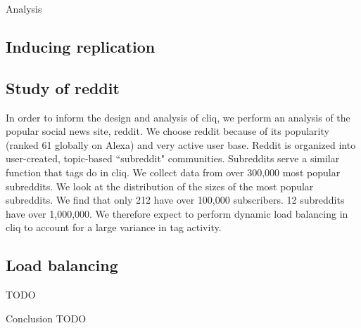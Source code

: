 \documentclass{sig-alternate}
\begin{document}
\begin{section}{Analysis}

\subsection{Inducing replication}
\label{subsec:inducereplication}


\subsection{Study of reddit}
\label{subsec:redditstudy}

In order to inform the design and analysis of cliq, we perform an analysis of the popular social news site, reddit. We choose reddit because of its popularity (ranked 61 globally on Alexa) and very active user base. Reddit is organized into user-created, topic-based ``subreddit" communities. Subreddits serve a similar function that tags do in cliq. We collect data from over 300,000 most popular subreddits. We look at the distribution of the sizes of the most popular subreddits. We find that only 212 have over 100,000 subscribers. 12 subreddits have over 1,000,000. We therefore expect to perform dynamic load balancing in cliq 
to account for a large variance in tag activity.

\subsection{Load balancing}
\label{subsec:loadbalancing}
TODO



\end{section}

\begin{section}{Conclusion}
  TODO
\end{section}



\end{document}
